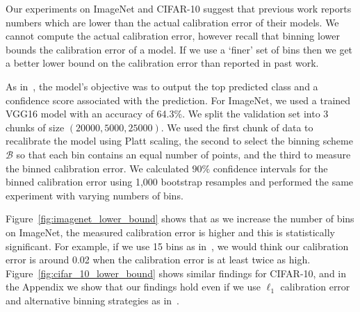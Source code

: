 Our experiments on ImageNet and CIFAR-10 suggest that previous work reports numbers which are lower than the actual calibration error of their models. We cannot compute the actual calibration error, however recall that binning lower bounds the calibration error of a model. If we use a `finer' set of bins then we get a better lower bound on the calibration error than reported in past work.

As in~\cite{guo2017calibration}, the model's objective was to output the top predicted class and a confidence score associated with the prediction. For ImageNet, we used a trained VGG16 model with an accuracy of 64.3\%. We split the validation set into 3 chunks of size $(20000, 5000, 25000)$. We used the first chunk of data to recalibrate the model using Platt scaling, the second to select the binning scheme $\mathcal{B}$ so that each bin contains an equal number of points, and the third to measure the binned calibration error. We calculated $90\%$ confidence intervals for the binned calibration error using 1,000 bootstrap resamples and performed the same experiment with varying numbers of bins.

Figure~\ref{fig:imagenet_lower_bound} shows that as we increase the number of bins on ImageNet, the measured calibration error is higher and this is statistically significant. For example, if we use 15 bins as in~\cite{guo2017calibration}, we would think our calibration error is around 0.02 when the calibration error is at least twice as high. Figure~\ref{fig:cifar_10_lower_bound} shows similar findings for CIFAR-10, and in the Appendix we show that our findings hold even if we use $\ell_1$ calibration error and alternative binning strategies as in~\cite{guo2017calibration}.

